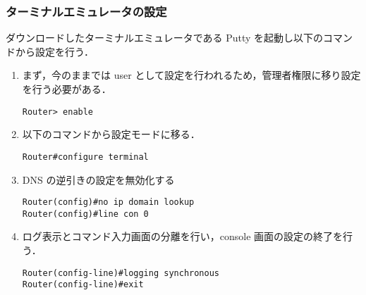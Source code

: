 \documentclass[a4j,titlepage]{jarticle}
\begin{document}
\subsubsection{ターミナルエミュレータの設定}
ダウンロードしたターミナルエミュレータである Putty を起動し以下のコマンドから設定を行う．

\begin{enumerate}
\item まず，今のままでは user として設定を行われるため，管理者権限に移り設定を行う必要がある．

\begin{center}
\begin{screen}
\begin{verbatim}
Router> enable
\end{verbatim}
\end{screen}
\end{center}

\item 以下のコマンドから設定モードに移る．

\begin{center}
\begin{screen}
\begin{verbatim}
Router#configure terminal
\end{verbatim}
\end{screen}
\end{center}

\item DNS の逆引きの設定を無効化する

\begin{center}
\begin{screen}
\begin{verbatim}
Router(config)#no ip domain lookup
Router(config)#line con 0 
\end{verbatim}
\end{screen}
\end{center}

\item ログ表示とコマンド入力画面の分離を行い，console 画面の設定の終了を行う．

\begin{center}
\begin{screen}
\begin{verbatim}
Router(config-line)#logging synchronous
Router(config-line)#exit
\end{verbatim}
\end{screen}
\end{center}


\end{enumerate}
\end{document}
